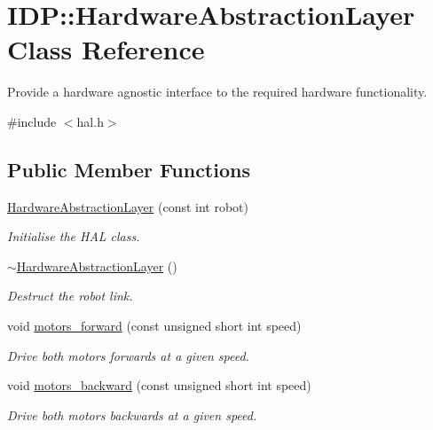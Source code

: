 \hypertarget{classIDP_1_1HardwareAbstractionLayer}{
\section{IDP::HardwareAbstractionLayer Class Reference}
\label{classIDP_1_1HardwareAbstractionLayer}
}


Provide a hardware agnostic interface to the required hardware functionality.  




{\ttfamily \#include $<$hal.h$>$}

\subsection*{Public Member Functions}
\begin{DoxyCompactItemize}
\item 
\hyperlink{classIDP_1_1HardwareAbstractionLayer_a424d40bbaed459f571b46dbb45bb8576}{HardwareAbstractionLayer} (const int robot)
\begin{DoxyCompactList}\small\item\em Initialise the HAL class. \item\end{DoxyCompactList}\item 
\hyperlink{classIDP_1_1HardwareAbstractionLayer_a0ddd51fb38c5fa8ecbfcd2004af2a468}{$\sim$HardwareAbstractionLayer} ()
\begin{DoxyCompactList}\small\item\em Destruct the robot link. \item\end{DoxyCompactList}\item 
void \hyperlink{classIDP_1_1HardwareAbstractionLayer_a300956b0e2e9f67e7f10baf036bf8616}{motors\_\-forward} (const unsigned short int speed)
\begin{DoxyCompactList}\small\item\em Drive both motors forwards at a given speed. \item\end{DoxyCompactList}\item 
void \hyperlink{classIDP_1_1HardwareAbstractionLayer_ac81fbf6aa2bb93837ed276c47556a398}{motors\_\-backward} (const unsigned short int speed)
\begin{DoxyCompactList}\small\item\em Drive both motors backwards at a given speed. \item\end{DoxyCompactList}\item 

\end{DoxyCompactItemize}
